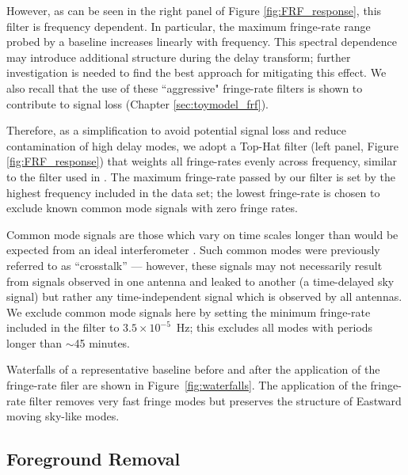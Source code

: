 However, as can be seen in the right panel of Figure \ref{fig:FRF_response}, this filter is frequency dependent.
In particular, the maximum fringe-rate range probed by a baseline increases linearly with frequency.
This spectral dependence may introduce additional structure during the delay transform; further investigation is needed to find the best approach for mitigating this effect.
We also recall that the use of these ``aggressive" fringe-rate filters is shown to contribute to signal loss
(Chapter \ref{sec:toymodel_frf}).

Therefore, as a simplification to avoid potential signal loss
and reduce contamination of high delay modes,
we adopt a Top-Hat filter (left panel, Figure \ref{fig:FRF_response})
that weights all fringe-rates evenly across frequency, similar to the filter used in \citet{parsons_et_al2012b}.
The maximum fringe-rate passed by our filter is set
by the highest frequency
included in the data set; the lowest fringe-rate is chosen to exclude known common mode signals with zero fringe
rates.

Common mode signals are those which vary on time scales longer than would be expected from an ideal interferometer \citep{ali_et_al2015}.
Such common modes were previously referred to as
	``crosstalk'' --- however, these signals may not
	necessarily result from signals observed in one antenna and leaked to another
	(a time-delayed sky signal) but rather any time-independent signal which is observed by all antennas. We exclude common mode signals here by setting the minimum fringe-rate included in the filter to $3.5\times10^{-5}$~Hz; this
excludes all modes with periods longer than $\sim$45 minutes.


Waterfalls of a representative baseline
before and after the application of the
fringe-rate filer are shown in Figure~\ref{fig:waterfalls}.
The application of the fringe-rate filter removes very fast
fringe modes but preserves the structure of Eastward moving sky-like modes.

\subsection{Foreground Removal}\label{sec:wida}

